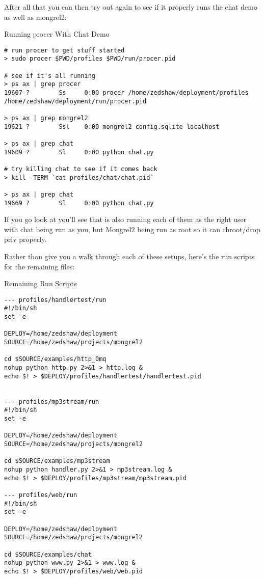 After all that you can then try out  again to see if it
properly runs the chat demo as well as mongrel2:

\begin{code}{Running procer With Chat Demo}
\begin{Verbatim}
# run procer to get stuff started
> sudo procer $PWD/profiles $PWD/run/procer.pid

# see if it's all running
> ps ax | grep procer
19607 ?        Ss     0:00 procer /home/zedshaw/deployment/profiles /home/zedshaw/deployment/run/procer.pid

> ps ax | grep mongrel2
19621 ?        Ssl    0:00 mongrel2 config.sqlite localhost

> ps ax | grep chat
19609 ?        Sl     0:00 python chat.py

# try killing chat to see if it comes back
> kill -TERM `cat profiles/chat/chat.pid`

> ps ax | grep chat
19669 ?        Sl     0:00 python chat.py
\end{Verbatim}
\end{code}

If you go look at  you'll see that 
is also running each of them as the right user with chat being run 
as you, but Mongrel2 being run as root so it can chroot/drop priv properly.

Rather than give you a walk through each of these setups, here's the
run scripts for the remaining files:

\begin{code}{Remaining Run Scripts}
\begin{Verbatim}
--- profiles/handlertest/run 
#!/bin/sh
set -e

DEPLOY=/home/zedshaw/deployment
SOURCE=/home/zedshaw/projects/mongrel2

cd $SOURCE/examples/http_0mq
nohup python http.py 2>&1 > http.log &
echo $! > $DEPLOY/profiles/handlertest/handlertest.pid


--- profiles/mp3stream/run 
#!/bin/sh
set -e

DEPLOY=/home/zedshaw/deployment
SOURCE=/home/zedshaw/projects/mongrel2

cd $SOURCE/examples/mp3stream
nohup python handler.py 2>&1 > mp3stream.log &
echo $! > $DEPLOY/profiles/mp3stream/mp3stream.pid

--- profiles/web/run 
#!/bin/sh
set -e

DEPLOY=/home/zedshaw/deployment
SOURCE=/home/zedshaw/projects/mongrel2

cd $SOURCE/examples/chat
nohup python www.py 2>&1 > www.log &
echo $! > $DEPLOY/profiles/web/web.pid

\end{Verbatim}
\end{code}


